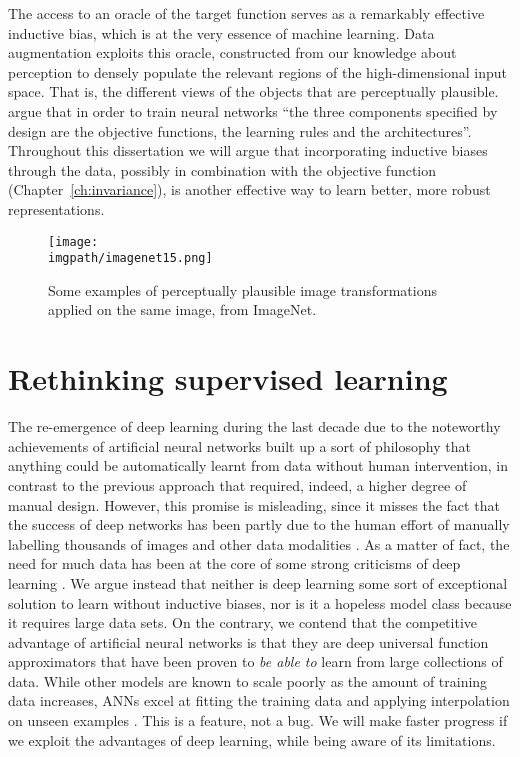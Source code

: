 {The access to an oracle of the target function serves as a remarkably effective inductive bias, which is at the very essence of machine learning. Data augmentation exploits this oracle, constructed from our knowledge about perception to densely populate the relevant regions of the high-dimensional input space. That is, the different views of the objects that are perceptually plausible. \citet{richards2019dlandneuroscience} argue that in order to train neural networks ``the three components specified by design are the objective functions, the learning rules and the architectures''. Throughout this dissertation we will argue that incorporating inductive biases through the data, possibly in combination with the objective function (Chapter~\ref{ch:invariance}), is another effective way to learn better, more robust representations.

\begin{figure}[htb]
  \begin{center}
    \texttt{[image: \\imgpath/imagenet15.png]}
  \end{center}
  \caption{Some examples of perceptually plausible image transformations applied on the same image, from ImageNet.}
\label{fig:intro-daug_imagenet}
\end{figure}

\section{Rethinking supervised learning}
\label{sec:intro-rethinking_supervised}
The re-emergence of deep learning during the last decade due to the noteworthy achievements of artificial neural networks built up a sort of philosophy that anything could be automatically learnt from data without human intervention, in contrast to the previous approach that required, indeed, a higher degree of manual design. However, this promise is misleading, since it misses the fact that the success of deep networks has been partly due to the human effort of manually labelling thousands of images and other data modalities \citep{russakovsky2015imagenet, cao2018vggface2}. As a matter of fact, the need for much data has been at the core of some strong criticisms of deep learning \citep{marcus2018critiquedl}. We argue instead that neither is deep learning some sort of exceptional solution to learn without inductive biases, nor is it a hopeless model class because it requires large data sets. On the contrary, we contend that the competitive advantage of artificial neural networks is that they are deep universal function approximators \citep{hornik1991functionapproximation} that have been proven to \textit{be able to} learn from large collections of data. While other models are known to scale poorly as the amount of training data increases, ANNs excel at fitting the training data and applying interpolation on unseen examples \citep{belkin2019biasvariance, hasson2020directfit}. This is a feature, not a bug. We will make faster progress if we exploit the advantages of deep learning, while being aware of its limitations.

}
